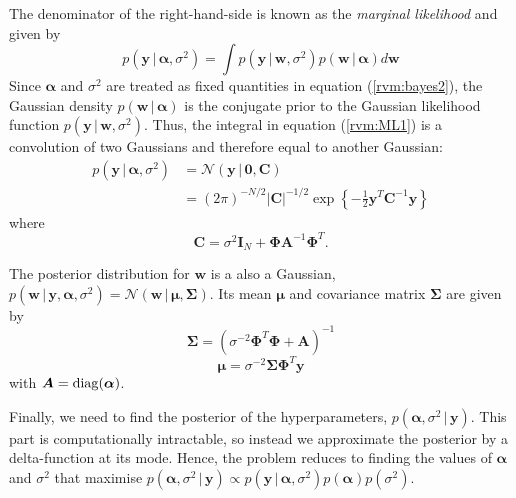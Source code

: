 The denominator of the right-hand-side is known as the \emph{marginal likelihood} and given by
\begin{equation}
  \label{rvm:ML1}
  p(\bm y\,|\,\bm\alpha,\sigma^2) = \int p(\bm y\,|\,\bm w,\sigma^2) p(\bm w\,|\,\bm \alpha) d\bm w
\end{equation}
Since $\bm\alpha$ and $\sigma^2$ are treated as fixed quantities in equation (\ref{rvm:bayes2}), the Gaussian density $p(\bm w\,|\,\bm\alpha)$ is the conjugate prior to the Gaussian likelihood function $p(\bm y\,|\,\bm w,\sigma^2)$.
Thus, the integral in equation (\ref{rvm:ML1}) is a convolution of two Gaussians and therefore equal to another Gaussian:
\begin{equation*}
  \begin{split}
    p(\bm y\,|\,\bm\alpha,\sigma^2) &= \mathcal{N}(\bm y\,|\,\bm 0,\bm C)\\
    &= (2\pi)^{-N/2} |\bm C|^{-1/2} \exp\left\{-\frac{1}{2}\bm y^T \bm C^{-1} \bm y\right\}
  \end{split}
\end{equation*}
where
\begin{equation}
  \label{rvm:C}
  \bm C = \sigma^2 \bm I_N + \bm\Phi\bm A^{-1}\bm\Phi^T.
\end{equation}

The posterior distribution for $\bm w$ is a also a Gaussian, $p(\bm w\,|\,\bm y,\bm\alpha,\sigma^2) = \mathcal{N}(\bm w\,|\,\bm\mu,\bm\Sigma)$.
Its mean $\bm \mu$ and covariance matrix $\bm\Sigma$ are given by
\begin{equation}
  \label{rvm:Sigma}
  \bm\Sigma = \left(\sigma^{-2}\bm\Phi^T\bm\Phi + \bm A\right)^{-1}
\end{equation}
\begin{equation}
  \label{rvm:mu}
  \bm\mu = \sigma^{-2}\bm\Sigma\bm\Phi^T\bm y
\end{equation}
with $\bm A = \operatorname*{diag}(\bm\alpha)$.

Finally, we need to find the posterior of the hyperparameters, $p(\bm\alpha,\sigma^2\,|\,\bm y)$.
This part is computationally intractable, so instead we approximate the posterior by a delta-function at its mode.
Hence, the problem reduces to finding the values of $\bm \alpha$ and $\sigma^2$ that maximise $p(\bm\alpha,\sigma^2\,|\,\bm y) \propto p(\bm y\,|\,\bm\alpha,\sigma^2)p(\bm\alpha)p(\sigma^2)$.

